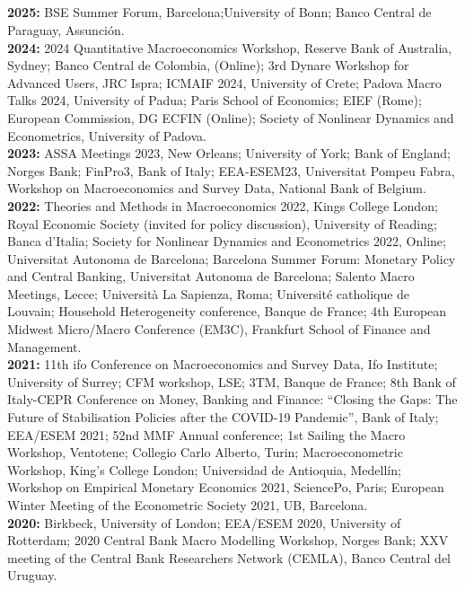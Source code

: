 \documentclass[margin, 11pt]{res} %
\begin{document}
\begin{resume}
\section{}
\textbf{2025:} {BSE Summer Forum, Barcelona;University of Bonn; Banco Central de Paraguay, Assunción.}
\\
\textbf{2024:} {2024 Quantitative Macroeconomics Workshop, Reserve Bank of Australia, Sydney; Banco Central de Colombia, (Online); 3rd Dynare Workshop for Advanced Users, JRC Ispra; ICMAIF 2024, University of Crete; Padova Macro Talks 2024, University of Padua; Paris School of Economics; EIEF (Rome); European Commission, DG ECFIN (Online); Society of Nonlinear Dynamics and Econometrics, University of Padova.}
\\
\textbf{2023:} {ASSA Meetings 2023, New Orleans; University of York; Bank of England; Norges Bank; FinPro3, Bank of Italy; EEA-ESEM23, Universitat Pompeu Fabra, Workshop on Macroeconomics and Survey Data, National Bank of Belgium.}
\\
\textbf{2022:} {Theories and Methods in Macroeconomics 2022, Kings College London; Royal Economic Society (invited for policy discussion), University of Reading; Banca d'Italia; Society for Nonlinear Dynamics and Econometrics 2022, Online; Universitat Autonoma de Barcelona; Barcelona Summer Forum: Monetary Policy and Central Banking, Universitat Autonoma de Barcelona; Salento Macro Meetings, Lecce; Universit\`{a} La Sapienza, Roma; Universit\'{e} catholique de Louvain; Household Heterogeneity conference, Banque de France; 4th European Midwest Micro/Macro Conference (EM3C), Frankfurt School of Finance and Management.}
\\
\textbf{2021:} {11th ifo Conference on Macroeconomics and Survey Data, Ifo Institute; University of Surrey; CFM workshop, LSE; 3TM, Banque de France; 8th Bank of Italy-CEPR Conference on Money, Banking and Finance: “Closing the Gaps: The Future of Stabilisation Policies after the COVID-19 Pandemic”, Bank of Italy; EEA/ESEM 2021; 52nd MMF Annual conference; 1st Sailing the Macro Workshop, Ventotene; Collegio Carlo Alberto, Turin; Macroeconometric Workshop, King's College London; Universidad de Antioquia, Medell\'{i}n; Workshop on Empirical Monetary Economics 2021, SciencePo, Paris; European Winter Meeting of the Econometric Society 2021, UB, Barcelona.}
\\
\textbf{2020:} {Birkbeck, University of London; EEA/ESEM 2020, University of Rotterdam; 2020 Central Bank Macro Modelling Workshop, Norges Bank; XXV meeting of the Central Bank Researchers Network (CEMLA), Banco Central del Uruguay.}

\end{resume}
\end{document}
